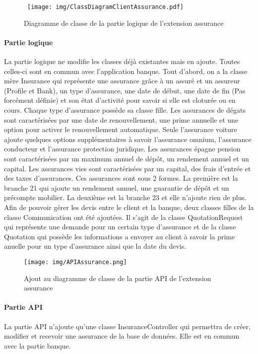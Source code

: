 \begin{figure}[h!]
    \hbox{
        \centering\texttt{[image: img/ClassDiagramClientAssurance.pdf]}
    }
    \caption{Diagramme de classe de la partie logique de l'extension assurance}
    \end{figure}
    
    \paragraph{Partie logique}La partie logique ne modifie les classes déjà existantes mais en ajoute. Toutes celles-ci sont en commun avec l'application banque. Tout d’abord, on a la classe mère Insurance qui représente une assurance grâce à un assuré et un assureur (Profile et Bank), un type d’assurance, une date de début, une date de fin (Pas forcément définie) et son état d’activité pour savoir si elle est cloturée ou en cours. Chaque type d’assurance possède sa classe fille. Les assurances de dégats sont caractérisées par une date de renouvellement, une prime annuelle et une option pour activer le renouvellement automatique. Seule l’assurance voiture ajoute quelques options supplémentaires à savoir l’assurance omnium, l’assurance conducteur et l’assurance protection juridique. Les assurances épagne pension sont caractérisées par un maximum annuel de dépôt, un rendement annuel et un capital. Les assurances vies sont caractérisées par un capital, des frais d’entrée et des taxes d’assurances. Ces assurances sont sous 2 formes. La première est la branche 21 qui ajoute un rendement annuel, une guarantie de dépôt et un précompte mobilier. La deuxième est la branche 23 et elle n’ajoute rien de plus. Afin de pouvoir gérer les devis entre le client et la banque, deux classes filles de la classe Communication ont été ajoutées. Il s’agit de la classe QuotationRequest qui représente une demande pour un certain type d’assurance et de la classe Quotation qui possède les informations a envoyer au client à savoir la prime anuelle pour un type d’assurance ainsi que la date du devis.
    
    \begin{figure}[ht]
    \centering
    \texttt{[image: img/APIAssurance.png]}
    \caption{Ajout au diagramme de classe de la partie API de l'extension assurance}
    \label{fig2}
    \end{figure}
    
    \paragraph{Partie API} La partie API n’ajoute qu’une classe InsuranceController qui permettra de créer, modifier et recevoir une assurance de la base de données. Elle est en commun avec la partie banque.
    
